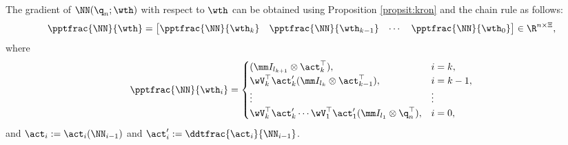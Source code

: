 \documentclass[letterpaper, journal]{IEEEtran}
\providecommand{\DIFaddbegin}{} %
\providecommand{\DIFaddend}{} %
\providecommand{\DIFdelbegin}{} %
\providecommand{\DIFdelend}{} %
\begin{document}
The gradient of $ \NN({\q}_n;\wth)$ with respect to $\wth$ can be obtained using Proposition \ref{propsit:kron} and the chain rule as follows:
\begin{equation}
    \pptfrac{\NN}{\wth}=
    \begin{bmatrix}
        \pptfrac{\NN}{\wth_k}&
        \pptfrac{\NN}{\wth_{k-1}}&
    \cdots &
        \pptfrac{\NN}{\wth_0}
    \end{bmatrix}
    \in\R^{n \times \Xi}
    ,
    \label{eq:gradient:phi}
\end{equation}
where
\begin{equation}
    \pptfrac{\NN}{\wth_i} = 
    \DIFdelbegin %
\DIFdelend \DIFaddbegin \begin{cases}
        (
            \mm I_{l_{k+1}}
            \otimes 
            \act_{k}^\top  
        )
        , 
        &
        i=k
        ,
        \\
        \wV_k^\top\act_{k}' 
        (
            \mm I_{l_{k}}
            \otimes  
            \act_{k-1}^\top  
        )
        , 
        & 
        i=k-1
        ,
        \\
        \vdots 
        &
        \vdots 
        \\
        \wV_k^\top\act'_{k} 
        \cdots 
        \wV_1^\top\act_1' 
        (
            \mm I_{l_1}
            \otimes 
            {\q}_n^\top  
        )
        , 
        &
        i = 0
        ,
    \end{cases}\DIFaddend 
    \label{eq:NN:grad}
\end{equation}
and $\act_i:= \act_i(\NN_{i-1})$ and $\act_i':= \ddtfrac{\act_i}{\NN_{i-1}}$.
\end{document}
